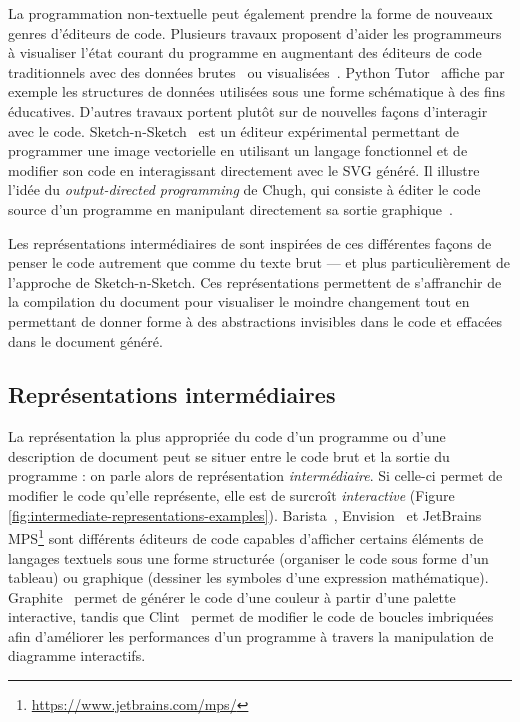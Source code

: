 La programmation non-textuelle peut également prendre la forme de nouveaux genres d'éditeurs de code.
Plusieurs travaux proposent d'aider les programmeurs à visualiser l'état courant du programme en augmentant des éditeurs de code traditionnels avec des données brutes~\cite{lerner2020projection} ou visualisées~\cite{hoffswell2018augmenting}.
Python Tutor~\cite{guo2013online} affiche par exemple les structures de données utilisées sous une forme schématique à des fins éducatives.
D'autres travaux portent plutôt sur de nouvelles façons d'interagir avec le code.
Sketch-n-Sketch~\cite{hempel2019sketch} est un éditeur expérimental permettant de programmer une image vectorielle en utilisant un langage fonctionnel et de modifier son code en interagissant directement avec le SVG généré.
Il illustre l'idée du \emph{output-directed programming} de Chugh, qui consiste à éditer le code source d'un programme en manipulant directement sa sortie graphique~\cite{chugh2016programmatic}.

Les représentations intermédiaires de \iLaTeX{} sont inspirées de ces différentes façons de penser le code autrement que comme du texte brut --- et plus particulièrement de l'approche de Sketch-n-Sketch.
Ces représentations permettent de s'affranchir de la compilation du document pour visualiser le moindre changement tout en permettant de donner forme à des abstractions invisibles dans le code et effacées dans le document généré.



\subsection{Représentations intermédiaires}

La représentation la plus appropriée du code d'un programme ou d'une description de document peut se situer entre le code brut et la sortie du programme : on parle alors de représentation \emph{intermédiaire}.
Si celle-ci permet de modifier le code qu'elle représente, elle est de surcroît \emph{interactive} (Figure \ref{fig:intermediate-representations-examples}).
Barista~\cite{ko2006barista}, Envision~\cite{asenov2014envision} et JetBrains MPS\footnote{\url{https://www.jetbrains.com/mps/}} sont différents éditeurs de code capables d'afficher certains éléments de langages textuels sous une forme structurée (\eg organiser le code sous forme d'un tableau) ou graphique (\eg dessiner les symboles d'une expression mathématique).
Graphite~\cite{omar2012active} permet de générer le code d'une couleur à partir d'une palette interactive, tandis que Clint~\cite{zinenko2014clint} permet de modifier le code de boucles imbriquées afin d'améliorer les performances d'un programme à travers la manipulation de diagramme interactifs.

